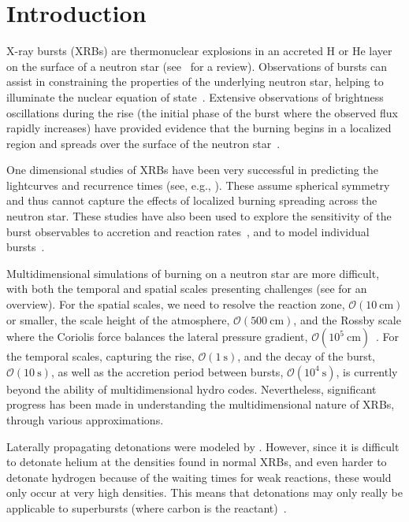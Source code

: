 \documentclass[preprint,times,tighten]{aastex63}
\begin{document}
\section{Introduction}\label{Sec:Introduction}

X-ray bursts (XRBs) are thermonuclear explosions in an accreted H or
He layer on the surface of a neutron star (see~\citealt{galloway:2017}
for a review).  Observations of bursts can assist in constraining the
properties of the underlying neutron star, helping to illuminate the
nuclear equation of state~\citep{steiner:2010,ozel2016masses}.  Extensive
observations of brightness oscillations during the rise (the initial phase of the burst where the observed flux rapidly increases) have provided
evidence that the burning begins in a localized region and spreads
over the surface of the neutron
star~\citep{bhattacharyya:2006,bhattacharyya:2007,chakraborty:2014}.

One dimensional studies of XRBs have been very successful in predicting the
lightcurves and recurrence times (see, e.g., \citealt{woosley-xrb}).
These assume spherical symmetry and thus cannot capture the effects of
localized burning spreading across the neutron star.  These studies
have also been used to explore the sensitivity of the burst
observables to accretion and reaction
rates~\citep{cyburt:2010,Jose2010a,Lampe2016}, and to model individual
bursts~\citep{johnston:2019}.

Multidimensional simulations of burning on a neutron star are more
difficult, with both the temporal and spatial scales presenting
challenges (see \citealt{astronum_2018} for an overview).  For the spatial scales, we need to
resolve the reaction zone, $\mathcal{O}(10~\mbox{cm})$ or smaller, the
scale height of the atmosphere, $\mathcal{O}(500~\mbox{cm})$, and the
Rossby scale where the Coriolis force balances the lateral pressure
gradient, $\mathcal{O}(10^5~\mbox{cm})$~\citep{spitkovsky2002}.  For
the temporal scales, capturing the rise, $\mathcal{O}(1~\mbox{s})$,
and the decay of the burst, $\mathcal{O}(10~\mbox{s})$, as well as the
accretion period between bursts, $\mathcal{O}(10^4~\mbox{s})$, is
currently beyond the ability of multidimensional hydro codes.
Nevertheless, significant progress has been made in understanding the
multidimensional nature of XRBs, through various approximations.

Laterally propagating detonations were modeled by
\citet{fryxellwoosley82,hedet}. However, since it is difficult to detonate helium at the
densities found in normal XRBs, and even harder to detonate hydrogen
because of the waiting times for weak reactions, these would only occur at
very high densities.  This means that
detonations may only really be applicable to superbursts (where carbon
is the reactant)~\citep{Weinberg2006b,Weinberg2007}.
\end{document}
